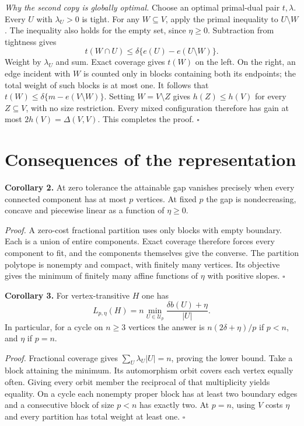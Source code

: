 \documentclass[11pt]{article}
\begin{document}
\textit{Why the second copy is globally optimal.} Choose an optimal primal-dual pair $t,\lambda$. Every $U$ with $\lambda_U>0$ is tight. For any $W\subseteq V$, apply the primal inequality to $U\setminus W$. The inequality also holds for the empty set, since $\eta\ge0$. Subtraction from tightness gives
\[
 t(W\cap U)\le\delta\{e(U)-e(U\setminus W)\}.
\]
Weight by $\lambda_U$ and sum. Exact coverage gives $t(W)$ on the left. On the right, an edge incident with $W$ is counted only in blocks containing both its endpoints; the total weight of such blocks is at most one. It follows that $t(W)\le\delta\{m-e(V\setminus W)\}$. Setting $W=V\setminus Z$ gives $h(Z)\le h(V)$ for every $Z\subseteq V$, with no size restriction. Every mixed configuration therefore has gain at most $2h(V)=\Delta(V,V)$. This completes the proof. $\square$

\section{Consequences of the representation}
\textbf{Corollary 2.} At zero tolerance the attainable gap vanishes precisely when every connected component has at most $p$ vertices. At fixed $p$ the gap is nondecreasing, concave and piecewise linear as a function of $\eta\ge0$.

\textit{Proof.} A zero-cost fractional partition uses only blocks with empty boundary. Each is a union of entire components. Exact coverage therefore forces every component to fit, and the components themselves give the converse. The partition polytope is nonempty and compact, with finitely many vertices. Its objective gives the minimum of finitely many affine functions of $\eta$ with positive slopes. $\square$

\textbf{Corollary 3.} For vertex-transitive $H$ one has
\[
 L_{p,\eta}(H)=n\min_{U\in\mathcal U_p}\frac{\delta b(U)+\eta}{|U|}.
\]
In particular, for a cycle on $n\ge3$ vertices the answer is $n(2\delta+\eta)/p$ if $p<n$, and $\eta$ if $p=n$.

\textit{Proof.} Fractional coverage gives $\sum_U\lambda_U|U|=n$, proving the lower bound. Take a block attaining the minimum. Its automorphism orbit covers each vertex equally often. Giving every orbit member the reciprocal of that multiplicity yields equality. On a cycle each nonempty proper block has at least two boundary edges and a consecutive block of size $p<n$ has exactly two. At $p=n$, using $V$ costs $\eta$ and every partition has total weight at least one. $\square$
\end{document}
